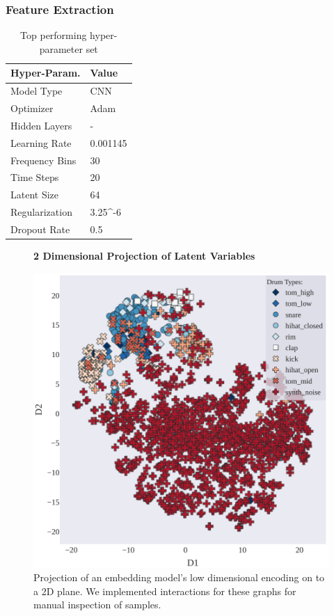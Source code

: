\documentclass[\main/thesis.tex]{subfiles}
\begin{document}
\subsubsection{Feature Extraction}
\label{fig:embedding_FE}
\begin{table}[htbp!]
\centering
\begin{tabular}{|p{6cm}|p{6cm}|}
\hline
Hyper-Param. & Value  \\ \hline
Model Type      &  CNN  \\ \hline
Optimizer       & Adam  \\ \hline
Hidden Layers   & -  \\\hline
Learning Rate   &  0.001145\\ \hline
Frequency Bins & 30 \\ \hline
Time Steps & 20 \\ \hline
Latent Size & 64 \\ \hline
Regularization & 3.25^{-6}\\ \hline
Dropout Rate & 0.5 \\ \hline
\end{tabular}
\caption{Top performing hyper-parameter set}
\label{table:best_params}
\end{table}
\begin{figure}[h!]
\centering
\textbf{2 Dimensional Projection of Latent Variables}\par\medskip
 \includegraphics[width=0.90\linewidth]{images/chapter_3/t-SNE_2d.pdf}
\caption{Projection of an embedding model's low dimensional encoding on to a 2D plane. We implemented interactions for these graphs for manual inspection of samples.}
\label{fig:2d_tsne}
\end{figure}
\end{document}
